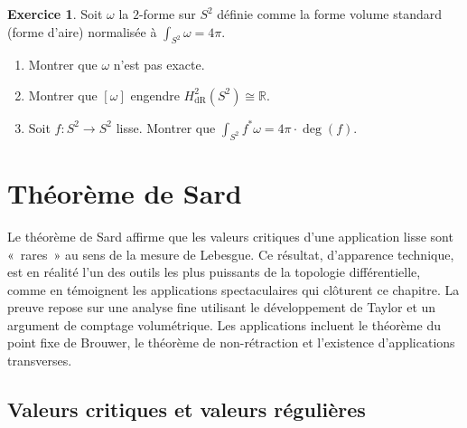\documentclass[12pt,a4paper,openany]{book}
\theoremstyle{definition}
\newtheorem{exercice}{Exercice}[chapter]
\theoremstyle{plain}
\theoremstyle{remark}
\newcommand{\R}{\mathbb{R}}
\begin{document}
\begin{exercice}\label{exo:stokes-12}
Soit $\omega$ la $2$-forme sur $S^2$ définie comme la forme volume standard
(forme d'aire) normalisée à $\int_{S^2} \omega = 4\pi$.
\begin{enumerate}[label=(\alph*)]
  \item Montrer que $\omega$ n'est pas exacte.
  \item Montrer que $[\omega]$ engendre $H^2_{\mathrm{dR}}(S^2) \cong \R$.
  \item Soit $f \colon S^2 \to S^2$ lisse. Montrer que $\int_{S^2} f^*\omega
  = 4\pi \cdot \deg(f)$.
\end{enumerate}
\end{exercice}


\chapter{Théorème de Sard}\label{ch:sard}
\minitoc\bigskip

Le théorème de Sard affirme que les valeurs critiques d'une application lisse
sont «~rares~» au sens de la mesure de Lebesgue. Ce résultat, d'apparence
technique, est en réalité l'un des outils les plus puissants de la topologie
différentielle, comme en témoignent les applications spectaculaires qui
clôturent ce chapitre. La preuve repose sur une analyse fine utilisant le
développement de Taylor et un argument de comptage volumétrique. Les
applications incluent le théorème du point fixe de Brouwer, le théorème de
non-rétraction et l'existence d'applications transverses.

\section{Valeurs critiques et valeurs régulières}\label{sec:critique-reguliere}
\end{document}
